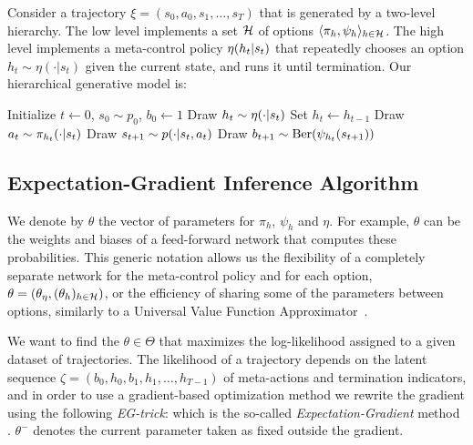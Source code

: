 Consider a trajectory $\xi=(s_0,a_0,s_1,\ldots,s_T)$ that is generated by a two-level hierarchy. The low level implements a set $\mathcal{H}$ of options $\langle \pi_h, \psi_h \rangle_{h\in\mathcal{H}}$. The high level implements a meta-control policy $\eta(h_t \vert s_t)$ that repeatedly chooses an option $h_t\sim\eta(\cdot|s_t)$ given the current state, and runs it until termination. Our hierarchical generative model is:
\begin{algorithmic}
    \State Initialize $t\gets0$, $s_0 \sim p_0$, $b_0 \gets 1$
            \State Draw $h_t \sim \eta(\cdot \vert s_t)$
        \Else{}
            \State Set $h_t \gets h_{t-1}$
        \EndIf
        \State Draw $a_t \sim \pi_{h_t}(\cdot \vert s_t)$
	\State Draw $s_{t+1} \sim p(\cdot \vert s_t, a_t)$
	\State Draw $b_{t+1} \sim \mathrm{Ber}(\psi_{h_t}(s_{t+1}))$
    \EndFor
\end{algorithmic}


\subsection{Expectation-Gradient Inference Algorithm}
We denote by $\theta$ the vector of parameters for $\pi_h$, $\psi_h$ and $\eta$. For example, $\theta$ can be the weights and biases of a feed-forward network that computes these probabilities. This generic notation allows us the flexibility of a completely separate network for the meta-control policy and for each option, $\theta=(\theta_\eta,(\theta_h)_{h\in\mathcal{H}})$, or the efficiency of sharing some of the parameters between options, similarly to a Universal Value Function Approximator~\cite{schaul2015universal}.

We want to find the $\theta\in\Theta$ that maximizes the log-likelihood assigned to a given dataset of trajectories. The likelihood of a trajectory depends on the latent sequence $\zeta = (b_0,h_0,b_1,h_1,\ldots,h_{T-1})$ of meta-actions and termination indicators, and in order to use a gradient-based optimization method we rewrite the gradient using the following \emph{EG-trick}:
which is the so-called \emph{Expectation-Gradient} method \cite{salakhutdinov2003optimization,mclachlan2007algorithm}. $\theta^-$ denotes the current parameter taken as fixed outside the gradient.

